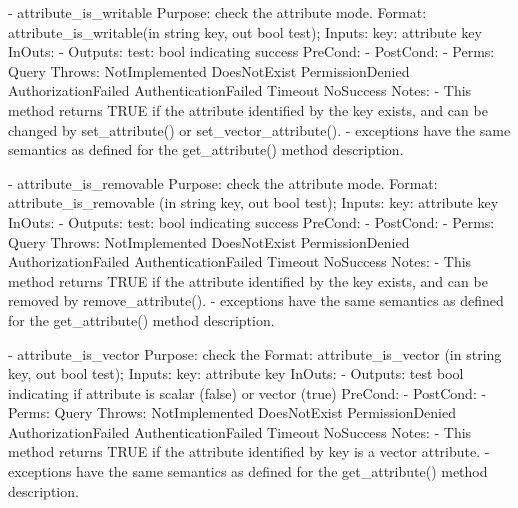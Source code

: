 \begin{myspec}
 
    - attribute_is_writable
      Purpose:  check the attribute mode.
      Format:   attribute_is_writable(in  string key,
                                      out bool   test);
      Inputs:   key:                  attribute key
      InOuts:   -
      Outputs:  test:                 bool indicating success
      PreCond:  -
      PostCond: -
      Perms:    Query
      Throws:   NotImplemented
                DoesNotExist
                PermissionDenied
                AuthorizationFailed
                AuthenticationFailed
                Timeout
                NoSuccess
      Notes:    - This method returns TRUE if the attribute
                  identified by the key exists, and can be
                  changed by set_attribute() or
                  set_vector_attribute().
                - exceptions have the same semantics as defined
                  for the get_attribute() method description.
 
 
    - attribute_is_removable
      Purpose:  check the attribute mode.
      Format:   attribute_is_removable (in  string key,
                                        out bool   test);
      Inputs:   key:                    attribute key
      InOuts:   -
      Outputs:  test:                   bool indicating success
      PreCond:  -
      PostCond: -
      Perms:    Query
      Throws:   NotImplemented
                DoesNotExist
                PermissionDenied
                AuthorizationFailed
                AuthenticationFailed
                Timeout
                NoSuccess
      Notes:    - This method returns TRUE if the attribute
                  identified by the key exists, and can be
                  removed by remove_attribute().
                - exceptions have the same semantics as defined
                  for the get_attribute() method description.
 
 
    - attribute_is_vector
      Purpose:  check the 
      Format:   attribute_is_vector  (in  string key,
                                      out bool   test);
      Inputs:   key:                  attribute key
      InOuts:   -
      Outputs:  test                  bool indicating if
                                      attribute is scalar
                                      (false) or vector (true)
      PreCond:  -
      PostCond: -
      Perms:    Query
      Throws:   NotImplemented
                DoesNotExist
                PermissionDenied
                AuthorizationFailed
                AuthenticationFailed
                Timeout
                NoSuccess
      Notes:    - This method returns TRUE if the attribute
                  identified by key is a vector attribute.
                - exceptions have the same semantics as defined
                  for the get_attribute() method description.
 \end{myspec}
 
